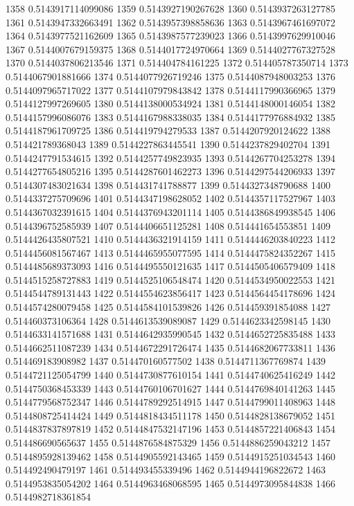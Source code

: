 1358 0.5143917114099086
1359 0.5143927190267628
1360 0.5143937263127785
1361 0.5143947332663491
1362 0.5143957398858636
1363 0.5143967461697072
1364 0.5143977521162609
1365 0.5143987577239023
1366 0.5143997629910046
1367 0.5144007679159375
1368 0.5144017724970664
1369 0.5144027767327528
1370 0.5144037806213546
1371 0.514404784161225
1372 0.514405787350714
1373 0.5144067901881666
1374 0.5144077926719246
1375 0.5144087948003253
1376 0.5144097965717022
1377 0.5144107979843842
1378 0.5144117990366965
1379 0.5144127997269605
1380 0.5144138000534924
1381 0.5144148000146054
1382 0.5144157996086076
1383 0.5144167988338035
1384 0.5144177976884932
1385 0.5144187961709725
1386 0.514419794279533
1387 0.5144207920124622
1388 0.514421789368043
1389 0.5144227863445541
1390 0.5144237829402704
1391 0.5144247791534615
1392 0.5144257749823935
1393 0.5144267704253278
1394 0.5144277654805216
1395 0.5144287601462273
1396 0.5144297544206933
1397 0.5144307483021634
1398 0.514431741788877
1399 0.5144327348790688
1400 0.5144337275709696
1401 0.5144347198628052
1402 0.5144357117527967
1403 0.5144367032391615
1404 0.5144376943201114
1405 0.5144386849938545
1406 0.5144396752585939
1407 0.5144406651125281
1408 0.514441654553851
1409 0.5144426435807521
1410 0.5144436321914159
1411 0.5144446203840223
1412 0.5144456081567467
1413 0.5144465955077595
1414 0.5144475824352267
1415 0.5144485689373093
1416 0.5144495550121635
1417 0.5144505406579409
1418 0.5144515258727883
1419 0.5144525106548474
1420 0.5144534950022553
1421 0.5144544789131443
1422 0.5144554623856417
1423 0.5144564454178696
1424 0.5144574280079458
1425 0.5144584101539826
1426 0.514459391854088
1427 0.514460373106364
1428 0.5144613539089087
1429 0.5144623342598145
1430 0.5144633141571688
1431 0.5144642935990545
1432 0.5144652725835488
1433 0.5144662511087239
1434 0.5144672291726474
1435 0.5144682067733811
1436 0.514469183908982
1437 0.514470160577502
1438 0.5144711367769874
1439 0.5144721125054799
1440 0.5144730877610154
1441 0.5144740625416249
1442 0.5144750368453339
1443 0.5144760106701627
1444 0.5144769840141263
1445 0.5144779568752347
1446 0.5144789292514915
1447 0.5144799011408963
1448 0.5144808725414424
1449 0.5144818434511178
1450 0.5144828138679052
1451 0.5144837837897819
1452 0.5144847532147196
1453 0.5144857221406843
1454 0.514486690565637
1455 0.5144876584875329
1456 0.5144886259043212
1457 0.5144895928139462
1458 0.5144905592143465
1459 0.5144915251034543
1460 0.514492490479197
1461 0.514493455339496
1462 0.5144944196822672
1463 0.5144953835054202
1464 0.5144963468068595
1465 0.5144973095844838
1466 0.5144982718361854
